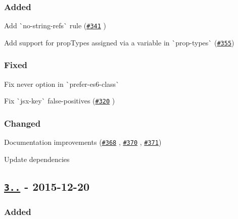 \subsubsection*{Added}


\begin{DoxyItemize}
\item Add \`{}no-\/string-\/refs\`{} rule (\href{https://github.com/yannickcr/eslint-plugin-react/issues/341}{\tt \#341} )
\item Add support for prop\+Types assigned via a variable in \`{}prop-\/types\`{} (\href{https://github.com/yannickcr/eslint-plugin-react/issues/355}{\tt \#355})
\end{DoxyItemize}

\subsubsection*{Fixed}


\begin{DoxyItemize}
\item Fix {\ttfamily never} option in \`{}prefer-\/es6-\/class\`{}
\item Fix \`{}jsx-\/key\`{} false-\/positives (\href{https://github.com/yannickcr/eslint-plugin-react/issues/320}{\tt \#320} )
\end{DoxyItemize}

\subsubsection*{Changed}


\begin{DoxyItemize}
\item Documentation improvements (\href{https://github.com/yannickcr/eslint-plugin-react/pull/368}{\tt \#368} , \href{https://github.com/yannickcr/eslint-plugin-react/pull/370}{\tt \#370} , \href{https://github.com/yannickcr/eslint-plugin-react/issues/371}{\tt \#371})
\item Update dependencies
\end{DoxyItemize}

\subsection*{\href{https://github.com/yannickcr/eslint-plugin-react/compare/v3.11.3...v3.12.0}{\tt 3..} -\/ 2015-\/12-\/20}

\subsubsection*{Added}


